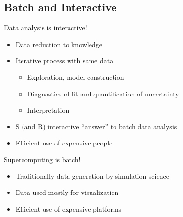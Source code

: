 \subsection{Batch and Interactive}
\makesubcontentsslidessec

\begin{frame}
  \begin{block}{Data analysis is interactive!}
    \pause
    \begin{itemize}[<+-|alert@+>]
    \item Data reduction to knowledge
    \item Iterative process with same data
      \begin{itemize}
      \item Exploration, model construction
      \item Diagnostics of fit and quantification of uncertainty
      \item Interpretation
      \end{itemize}
    \item S (and R) interactive ``answer'' to batch data analysis
    \item Efficient use of expensive people
    \end{itemize}
  \end{block}
  \begin{block}{Supercomputing is batch!}
    \pause
    \begin{itemize}[<+-|alert@+>]
    \item Traditionally data generation by simulation science
    \item Data used mostly for visualization
    \item Efficient use of expensive platforms
    \end{itemize}
  \end{block}
\end{frame}

